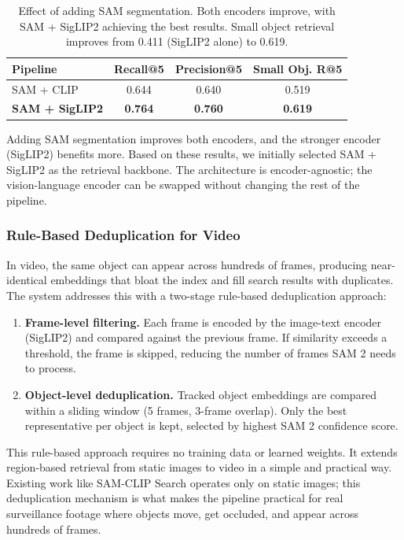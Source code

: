 \begin{table}[H]
    \centering
    \begin{tabular}{lccc}
        \toprule
        \textbf{Pipeline} & \textbf{Recall@5} & \textbf{Precision@5} & \textbf{Small Obj. R@5} \\
        \midrule
        SAM + CLIP & 0.644 & 0.640 & 0.519 \\
        \midrule
        \textbf{SAM + SigLIP2} & \textbf{0.764} & \textbf{0.760} & \textbf{0.619} \\
        \bottomrule
    \end{tabular}
    \caption{Effect of adding SAM segmentation. Both encoders improve, with SAM + SigLIP2 achieving the best results. Small object retrieval improves from 0.411 (SigLIP2 alone) to 0.619.}
    \label{tab:sam-effect}
\end{table}

Adding SAM segmentation improves both encoders, and the stronger encoder (SigLIP2) benefits more. Based on these results, we initially selected SAM + SigLIP2 as the retrieval backbone. The architecture is encoder-agnostic; the vision-language encoder can be swapped without changing the rest of the pipeline.

\subsubsection{Rule-Based Deduplication for Video}
\label{subsubsec:dedup}

In video, the same object can appear across hundreds of frames, producing near-identical embeddings that bloat the index and fill search results with duplicates. The system addresses this with a two-stage rule-based deduplication approach:

\begin{enumerate}
    \item \textbf{Frame-level filtering.} Each frame is encoded by the image-text encoder (SigLIP2) and compared against the previous frame. If similarity exceeds a threshold, the frame is skipped, reducing the number of frames SAM 2 needs to process.

    \item \textbf{Object-level deduplication.} Tracked object embeddings are compared within a sliding window (5 frames, 3-frame overlap). Only the best representative per object is kept, selected by highest SAM 2 confidence score.
\end{enumerate}

This rule-based approach requires no training data or learned weights. It extends region-based retrieval from static images to video in a simple and practical way. Existing work like SAM-CLIP Search \cite{mulani2025samclip} operates only on static images; this deduplication mechanism is what makes the pipeline practical for real surveillance footage where objects move, get occluded, and appear across hundreds of frames.

